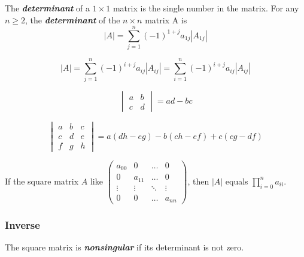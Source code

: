 \begin{definition}[Determinant]
	The \textit{\textbf{determinant}} of a $1 \times 1$ matrix is the single number in the matrix. For any $n \geq 2$, the \textit{\textbf{determinant}} of the $n \times n$ matrix A is
	\begin{equation*}
		|A| = \sum_{j=1}^{n} (-1)^{1+j}a_{1j}|A_{1j}|
	\end{equation*}
\end{definition}

\begin{proposition}
	\begin{equation*}
		|A| = \sum_{j=1}^{n} (-1)^{i+j}a_{ij}|A_{ij}| = \sum_{i=1}^{n} (-1)^{i+j}a_{ij}|A_{ij}|
	\end{equation*}
\end{proposition}

\begin{example}
	\begin{equation*}
		\begin{vmatrix}
			a & b \\
			c & d
		\end{vmatrix} = ad - bc
	\end{equation*}

	\begin{equation*}
		\begin{vmatrix}
			a & b & c \\
			c & d & e \\
			f & g & h
		\end{vmatrix} = a(dh-eg) - b(ch-ef) + c(cg-df)
	\end{equation*}
\end{example}

If the square matrix $A$ like $\begin{pmatrix}
		a_{00} & 0      & \dots  & 0      \\
		0      & a_{11} & \dots  & 0      \\
		\vdots & \vdots & \ddots & \vdots \\
		0      & 0      & \dots  & a_{nn}
	\end{pmatrix}$, then $|A|$ equals $\prod_{i=0}^{n}a_{ii}$.

\subsubsection{Inverse}

\begin{definition}[Nonsingular]
	The square matrix is \textit{\textbf{nonsingular}} if its determinant is not zero.
\end{definition}

